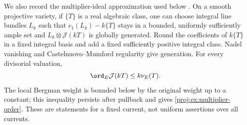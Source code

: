 We also record the multiplier-ideal approximation used below
\cite[Theorems~5.11, 6.27, and 14.2]{Proj-Demailly2012}. On a smooth projective variety, if \(\{T\}\)
is a real algebraic class, one can choose integral line bundles
\(L_k\) such that \(c_1(L_k)-k\{T\}\) stays in a bounded,
uniformly sufficiently ample set and
\(L_k\otimes\mathcal J(kT)\) is globally generated. Round the
coefficients of \(k\{T\}\) in a fixed integral basis and add a
fixed sufficiently positive integral class. Nadel vanishing and
Castelnuovo--Mumford regularity give generation. For every
divisorial valuation,
\begin{equation}\label{proj:ex:multiplier-order}
 \ord_E\mathcal J(kT)\leq k\nu_E(T).
\end{equation}
The local Bergman weight is bounded below by the original weight
up to a constant; this inequality persists after pullback and
gives \eqref{proj:ex:multiplier-order}. These are statements for a
fixed current, not uniform assertions over all currents.

